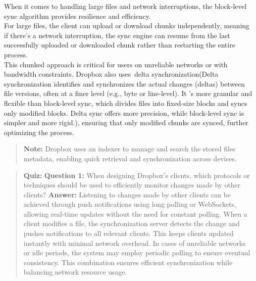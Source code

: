 When it comes to handling large files and network interruptions, the block-level sync algorithm provides resilience and efficiency.
\\
For large files, the client can upload or download chunks independently, meaning if there's a network interruption, the sync engine can resume from the last successfully uploaded or downloaded chunk rather than restarting the entire process.
\\
This chunked approach is critical for users on unreliable networks or with bandwidth constraints. Dropbox also uses~delta synchronization(Delta synchronization identifies and synchronizes the actual changes (deltas) between file versions, often at a finer level (e.g., byte or line-level). It 's more granular and flexible than block-level sync, which divides files into fixed-size blocks and syncs only modified blocks. Delta sync offers more precision, while block-level sync is simpler and more rigid.), ensuring that only modified chunks are synced, further optimizing the process.
\begin{quote}
\textbf{Note:} Dropbox uses an indexer to manage and search the stored files metadata, enabling quick retrieval and synchronization across devices.
\end{quote}

\begin{quote}
\textbf{Quiz:}
\textbf{Question 1:} When designing Dropbox's clients, which protocols or techniques should be used to efficiently monitor changes made by other clients?
\textbf{Answer:} Listening to changes made by other clients can be achieved through push notifications using long polling or WebSockets, allowing real-time updates without the need for constant polling. When a client modifies a file, the synchronization server detects the change and pushes notifications to all relevant clients. This keeps clients updated instantly with minimal network overhead. In cases of unreliable networks or idle periods, the system may employ periodic polling to ensure eventual consistency. This combination ensures efficient synchronization while balancing network resource usage.
\end{quote}

